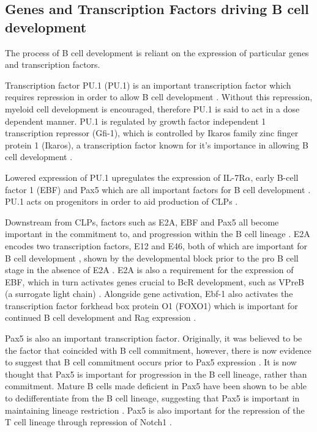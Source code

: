 \subsection{Genes and Transcription Factors driving B cell development}
\label{subsec:Bcellgenes}

The process of B cell development is reliant on the expression of particular genes and transcription factors.

Transcription factor PU.1 (PU.1) is an important transcription factor which requires repression in order to allow B cell development \citep{Dekoter2000}. 
Without this repression, myeloid cell development is encouraged, therefore PU.1 is said to act in a dose dependent manner.
PU.1 is regulated by growth factor independent 1 transcription repressor (Gfi-1), which is controlled by Ikaros family zinc finger protein 1 (Ikaros), a transcription factor known for it's importance in allowing B cell development \citep{Yoshida2006, Busslinger2004}. 

Lowered expression of PU.1 upregulates the expression of IL-7R$\alpha$, early B-cell factor 1 (EBF) and Pax5 which are all important factors for B cell development \citep{Hagman2006}.
PU.1 acts on progenitors in order to aid production of CLPs \citep{Hagman2006}.

Downstream from CLPs, factors such as E2A, EBF and Pax5 all become important in the commitment to, and progression within the B cell lineage \citep{Mansson2008}.
E2A encodes two transcription factors, E12 and E46, both of which are important for B cell development \citep{Bain1997}, shown by the developmental block prior to the pro B cell stage in the absence of E2A \citep{Bain1994}.
E2A is also a requirement for the expression of EBF, which in turn activates genes crucial to BcR development, such as VPreB (a surrogate light chain) \citep{Welinder2011}.
Alongside gene activation, Ebf-1 also activates the transcription factor forkhead box protein O1 (FOXO1) which is important for continued B cell development and Rag expression \citep{Amin2008}.

Pax5 is also an important transcription factor.
Originally, it was believed to be the factor that coincided with B cell commitment, however, there is now evidence to suggest that B cell commitment occurs prior to Pax5 expression \citep{Welinder2011}.
It is now thought that Pax5 is important for progression in the B cell lineage, rather than commitment.
Mature B cells made deficient in Pax5 have been shown to be able to dedifferentiate from the B cell lineage, suggesting that Pax5 is important in maintaining lineage restriction \citep{Cobaleda2007}.
Pax5 is also important for the repression of the T cell lineage through repression of Notch1 \citep{Souabni2002}.

